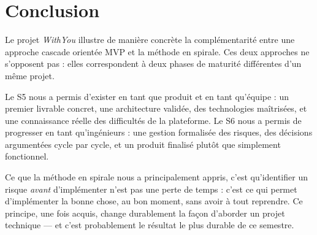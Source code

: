 \documentclass[11pt,a4paper]{report}
\begin{document}
\chapter{Conclusion}

Le projet \textit{WithYou} illustre de manière concrète la complémentarité entre une approche cascade orientée MVP et la méthode en spirale. Ces deux approches ne s'opposent pas : elles correspondent à deux phases de maturité différentes d'un même projet.

Le S5 nous a permis d'exister en tant que produit et en tant qu'équipe : un premier livrable concret, une architecture validée, des technologies maîtrisées, et une connaissance réelle des difficultés de la plateforme. Le S6 nous a permis de progresser en tant qu'ingénieurs : une gestion formalisée des risques, des décisions argumentées cycle par cycle, et un produit finalisé plutôt que simplement fonctionnel.

Ce que la méthode en spirale nous a principalement appris, c'est qu'identifier un risque \textit{avant} d'implémenter n'est pas une perte de temps : c'est ce qui permet d'implémenter la bonne chose, au bon moment, sans avoir à tout reprendre. Ce principe, une fois acquis, change durablement la façon d'aborder un projet technique --- et c'est probablement le résultat le plus durable de ce semestre.
\end{document}
